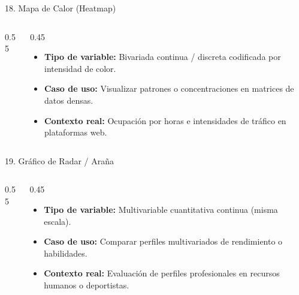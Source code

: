 \documentclass[aspectratio=169,10pt]{beamer}
\begin{document}
\begin{frame}{18. Mapa de Calor (Heatmap)}
\begin{columns}
\begin{column}{0.55\textwidth}
\end{column}
\begin{column}{0.45\textwidth}
\begin{itemize}\small
\item \textbf{Tipo de variable:} Bivariada continua / discreta codificada por intensidad de color.
\item \textbf{Caso de uso:} Visualizar patrones o concentraciones en matrices de datos densas.
\item \textbf{Contexto real:} Ocupación por horas e intensidades de tráfico en plataformas web.
\end{itemize}
\end{column}
\end{columns}
\end{frame}

\begin{frame}{19. Gráfico de Radar / Araña}
\begin{columns}
\begin{column}{0.55\textwidth}
\end{column}
\begin{column}{0.45\textwidth}
\begin{itemize}\small
\item \textbf{Tipo de variable:} Multivariable cuantitativa continua (misma escala).
\item \textbf{Caso de uso:} Comparar perfiles multivariados de rendimiento o habilidades.
\item \textbf{Contexto real:} Evaluación de perfiles profesionales en recursos humanos o deportistas.
\end{itemize}
\end{column}
\end{columns}
\end{frame}
\end{document}
